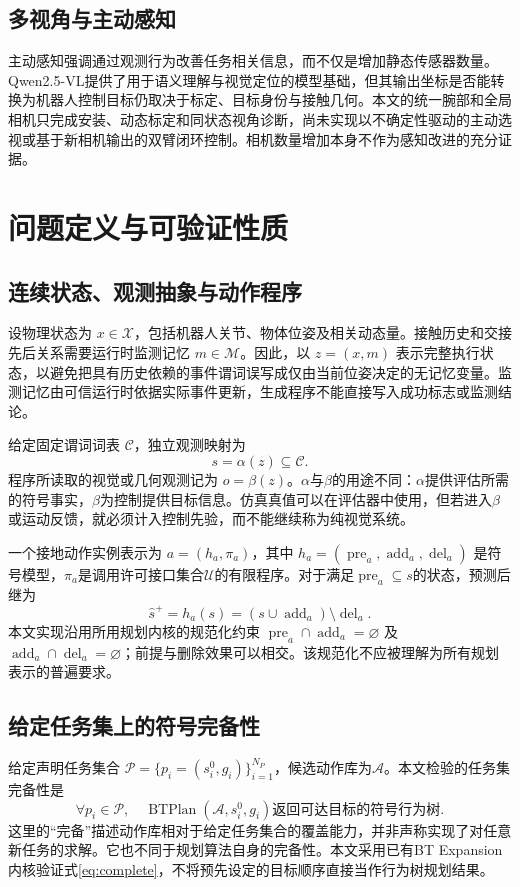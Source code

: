 \documentclass[UTF8,zihao=-4,fontset=fandol,a4paper]{ctexart}
\newcommand{\C}{\mathcal{C}}
\newcommand{\A}{\mathcal{A}}
\newcommand{\Pset}{\mathcal{P}}
\newcommand{\pre}{\operatorname{pre}}
\newcommand{\add}{\operatorname{add}}
\newcommand{\del}{\operatorname{del}}
\begin{document}
\subsection{多视角与主动感知}
主动感知强调通过观测行为改善任务相关信息，而不仅是增加静态传感器数量\cite{active2018}。Qwen2.5-VL提供了用于语义理解与视觉定位的模型基础\cite{qwen25vl}，但其输出坐标是否能转换为机器人控制目标仍取决于标定、目标身份与接触几何。本文的统一腕部和全局相机只完成安装、动态标定和同状态视角诊断，尚未实现以不确定性驱动的主动选视或基于新相机输出的双臂闭环控制。相机数量增加本身不作为感知改进的充分证据。

\section{问题定义与可验证性质}
\subsection{连续状态、观测抽象与动作程序}
设物理状态为 $x\in\mathcal{X}$，包括机器人关节、物体位姿及相关动态量。接触历史和交接先后关系需要运行时监测记忆 $m\in\mathcal{M}$。因此，以 $z=(x,m)$ 表示完整执行状态，以避免把具有历史依赖的事件谓词误写成仅由当前位姿决定的无记忆变量。监测记忆由可信运行时依据实际事件更新，生成程序不能直接写入成功标志或监测结论。

给定固定谓词词表 $\C$，独立观测映射为
\begin{equation}
    s=\alpha(z)\subseteq\C.
\end{equation}
程序所读取的视觉或几何观测记为 $o=\beta(z)$。$\alpha$与$\beta$的用途不同：$\alpha$提供评估所需的符号事实，$\beta$为控制提供目标信息。仿真真值可以在评估器中使用，但若进入$\beta$或运动反馈，就必须计入控制先验，而不能继续称为纯视觉系统。

一个接地动作实例表示为 $a=(h_a,\pi_a)$，其中 $h_a=(\pre_a,\add_a,\del_a)$ 是符号模型，$\pi_a$是调用许可接口集合$\mathcal{U}$的有限程序。对于满足$\pre_a\subseteq s$的状态，预测后继为
\begin{equation}
    \widehat{s}^{+}=h_a(s)=(s\cup\add_a)\setminus\del_a.
    \label{eq:strips}
\end{equation}
本文实现沿用所用规划内核的规范化约束 $\pre_a\cap\add_a=\varnothing$ 及 $\add_a\cap\del_a=\varnothing$；前提与删除效果可以相交。该规范化不应被理解为所有规划表示的普遍要求。

\subsection{给定任务集上的符号完备性}
给定声明任务集合 $\Pset=\{p_i=(s_i^0,g_i)\}_{i=1}^{N_P}$，候选动作库为$\A$。本文检验的任务集完备性是
\begin{equation}
    \forall p_i\in\Pset,\quad
    \operatorname{BTPlan}(\A,s_i^0,g_i)\text{返回可达目标的符号行为树}.
    \label{eq:complete}
\end{equation}
这里的“完备”描述动作库相对于给定任务集合的覆盖能力，并非声称实现了对任意新任务的求解。它也不同于规划算法自身的完备性。本文采用已有BT Expansion内核验证式\eqref{eq:complete}，不将预先设定的目标顺序直接当作行为树规划结果。
\end{document}
